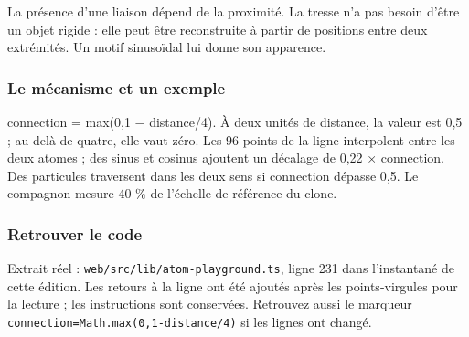 \documentclass[
  canadien,
  11pt,
  letterpaper,
]{article}
\begin{document}
La présence d'une liaison dépend de la proximité. La tresse n'a pas
besoin d'être un objet rigide : elle peut être reconstruite à partir de
positions entre deux extrémités. Un motif sinusoïdal lui donne son
apparence.

\subsubsection{Le mécanisme et un
exemple}\label{le-muxe9canisme-et-un-exemple-13}

connection = max(0,1 − distance/4). À deux unités de distance, la valeur
est 0,5 ; au-delà de quatre, elle vaut zéro. Les 96 points de la ligne
interpolent entre les deux atomes ; des sinus et cosinus ajoutent un
décalage de 0,22 × connection. Des particules traversent dans les deux
sens si connection dépasse 0,5. Le compagnon mesure 40 \% de l'échelle
de référence du clone.

\subsubsection{Retrouver le code}\label{retrouver-le-code-13}

Extrait réel : \texttt{web/src/lib/atom-playground.ts}, ligne 231 dans
l'instantané de cette édition. Les retours à la ligne ont été ajoutés
après les points-virgules pour la lecture ; les instructions sont
conservées. Retrouvez aussi le marqueur
\texttt{connection=Math.max(0,1-distance/4)} si les lignes ont changé.
\end{document}
